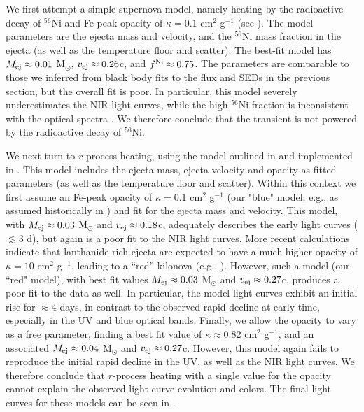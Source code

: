 We first attempt a simple supernova model, namely heating by the radioactive decay of $^{56}$Ni and Fe-peak opacity of $\kappa = 0.1$ cm$^{2}$ g$^{-1}$ (see \citealt{Villar+17a}).  The model parameters are the ejecta mass and velocity, and the $^{56}$Ni mass fraction in the ejecta (as well as the temperature floor and scatter).  The best-fit model has $M_{\rm ej}\approx 0.01$ M$_\odot$, $v_{\rm ej}\approx 0.26$c, and $f^{\rm Ni}\approx 0.75$.  The parameters are comparable to those we inferred from black body fits to the flux and SEDs in the previous section, but the overall fit is poor.  In particular, this model severely underestimates the NIR light curves, while the high $^{56}$Ni fraction is inconsistent with the optical spectra \citep{Nicholl+17a}.  We therefore conclude that the transient is not powered by the radioactive decay of $^{56}$Ni.

We next turn to $r$-process heating, using the model outlined in \citet{Metzger2017} and implemented in \citet{Villar+17a}. This model includes the ejecta mass, ejecta velocity and opacity as fitted parameters (as well as the temperature floor and scatter). Within this context we first assume an Fe-peak opacity of $\kappa = 0.1$ cm$^{2}$ g$^{-1}$ (our "blue" model; e.g., as assumed historically in \citealt{LP98}) and fit for the ejecta mass and velocity.  This model, with $M_{\rm ej}\approx 0.03$ M$_\odot$ and $v_{\rm ej}\approx 0.18$c, adequately describes the early light curves ($\lesssim 3$ d), but again is a poor fit to the NIR light curves.  More recent calculations indicate that lanthanide-rich ejecta are expected to have a much higher opacity of $\kappa = 10$ cm$^{2}$ g$^{-1}$, leading to a ``red'' kilonova (e.g., \citealt{BarnesKasen13}).  However, such a model (our ``red" model), with best fit values $M_{\rm ej}\approx 0.03$ M$_\odot$ and $v_{\rm ej}\approx 0.27$c, produces a poor fit to the data as well.  In particular, the model light curves exhibit an initial rise for $\approx 4$ days, in contrast to the observed rapid decline at early time, especially in the UV and blue optical bands.  Finally, we allow the opacity to vary as a free parameter, finding a best fit value of $\kappa \approx 0.82$ cm$^{2}$ g$^{-1}$, and an associated $M_{\rm ej}\approx 0.04$ M$_\odot$ and $v_{\rm ej}\approx 0.27$c.  However, this model again fails to reproduce the initial rapid decline in the UV, as well as the NIR light curves.  We therefore conclude that $r$-process heating with a single value for the opacity cannot explain the observed light curve evolution and colors. The final light curves for these models can be seen in .

